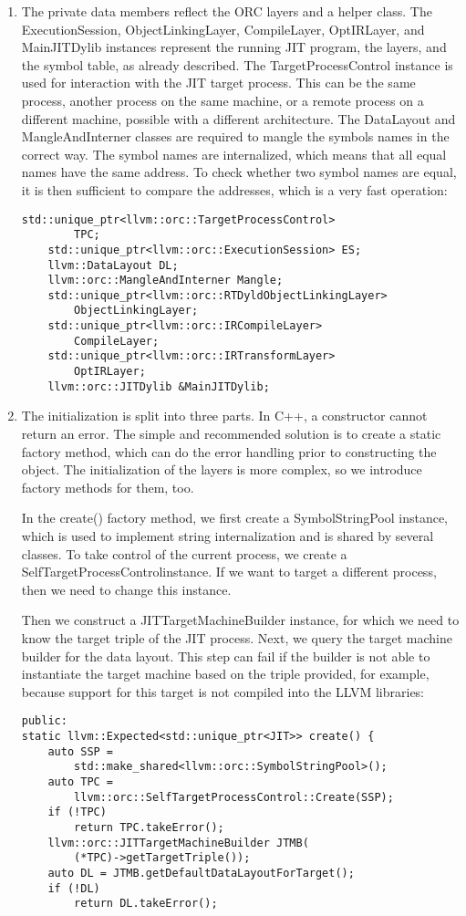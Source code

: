 \begin{enumerate}
\item The private data members reflect the ORC layers and a helper class. The ExecutionSession, ObjectLinkingLayer, CompileLayer, OptIRLayer, and MainJITDylib instances represent the running JIT program, the layers, and the symbol table, as already described. The TargetProcessControl instance is used for interaction with the JIT target process. This can be the same process, another process on the same machine, or a remote process on a different machine, possible with a different architecture. The DataLayout and MangleAndInterner classes are required to mangle the symbols names in the correct way. The symbol names are internalized, which means that all equal names have the same address. To check whether two symbol names are equal, it is then sufficient to compare the addresses, which is a very fast operation:
\begin{lstlisting}[caption={}]
	std::unique_ptr<llvm::orc::TargetProcessControl> 
		TPC;
	std::unique_ptr<llvm::orc::ExecutionSession> ES;
	llvm::DataLayout DL;
	llvm::orc::MangleAndInterner Mangle;
	std::unique_ptr<llvm::orc::RTDyldObjectLinkingLayer>
		ObjectLinkingLayer;
	std::unique_ptr<llvm::orc::IRCompileLayer>
		CompileLayer;
	std::unique_ptr<llvm::orc::IRTransformLayer>
		OptIRLayer;
	llvm::orc::JITDylib &MainJITDylib;
\end{lstlisting}

\item The initialization is split into three parts. In C++, a constructor cannot return an error. The simple and recommended solution is to create a static factory method, which can do the error handling prior to constructing the object. The initialization of the layers is more complex, so we introduce factory methods for them, too.\par
In the create() factory method, we first create a SymbolStringPool instance, which is used to implement string internalization and is shared by several classes. To take control of the current process, we create a SelfTargetProcessControlinstance. If we want to target a different process, then we need to change this instance.\par
Then we construct a JITTargetMachineBuilder instance, for which we need to know the target triple of the JIT process. Next, we query the target machine builder for the data layout. This step can fail if the builder is not able to instantiate the target machine based on the triple provided, for example, because support for this target is not compiled into the LLVM libraries:
\begin{lstlisting}[caption={}]
public:
static llvm::Expected<std::unique_ptr<JIT>> create() {
	auto SSP =
		std::make_shared<llvm::orc::SymbolStringPool>();
	auto TPC =
		llvm::orc::SelfTargetProcessControl::Create(SSP);
	if (!TPC)
		return TPC.takeError();
	llvm::orc::JITTargetMachineBuilder JTMB(
		(*TPC)->getTargetTriple());
	auto DL = JTMB.getDefaultDataLayoutForTarget();
	if (!DL)
		return DL.takeError();
\end{lstlisting}


\end{enumerate}
